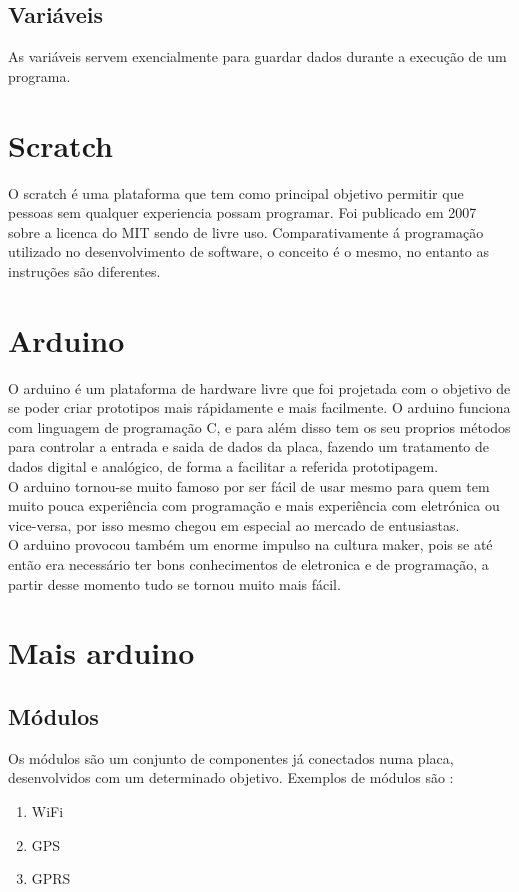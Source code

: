 \documentclass{article}
\begin{document}
\subsection{Variáveis}
As variáveis servem exencialmente para guardar dados durante a execução de um programa.

\section{Scratch}
O scratch é uma plataforma que tem como principal objetivo permitir que pessoas sem qualquer experiencia possam programar. Foi publicado em 2007 sobre a licenca do MIT sendo de livre uso.\newline
Comparativamente á programação utilizado no desenvolvimento de software, o conceito é o mesmo, no entanto as instruções são diferentes.

\section{Arduino}
O arduino é um plataforma de hardware livre que foi projetada com o objetivo de se poder criar prototipos mais rápidamente e mais facilmente. O arduino funciona com linguagem de programação C, e para além disso tem os seu proprios métodos para controlar a entrada e saida de dados da placa, fazendo um tratamento de dados digital e analógico, de forma a facilitar a referida prototipagem.\newline \\
O arduino tornou-se muito famoso por ser fácil de usar mesmo para quem tem muito pouca experiência com programação e mais experiência com eletrónica ou vice-versa, por isso mesmo chegou em especial ao mercado de entusiastas.\newline \\
O arduino provocou também um enorme impulso na cultura maker, pois se até então era necessário ter bons conhecimentos de eletronica e de programação, a partir desse momento tudo se tornou muito mais fácil.\newline \\

\section{Mais arduino}

\subsection{Módulos}
Os módulos são um conjunto de componentes já conectados numa placa, desenvolvidos com um determinado objetivo. Exemplos de módulos são :
\begin{enumerate}
\item WiFi
\item GPS
\item GPRS
\end{enumerate}
\end{document}
